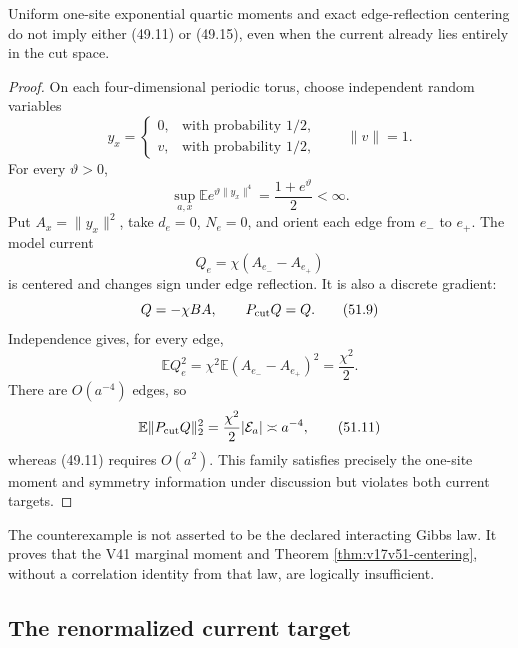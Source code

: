 \documentclass[11pt]{article}
\theoremstyle{remark}
\begin{document}
\begin{countertheorem}
\label{ctr:v17v51-no-go}
Uniform one-site exponential quartic moments and exact edge-reflection
centering do not imply either (49.11) or (49.15), even when the current
already lies entirely in the cut space.
\end{countertheorem}

\begin{proof}
On each four-dimensional periodic torus, choose independent random
variables
\[
 y_x=
 \begin{cases}
 0,&\text{with probability }1/2,\\
 v,&\text{with probability }1/2,
 \end{cases}
 \qquad \|v\|=1.                                  \tag{51.6}
\]
For every \(\vartheta>0\),
\[
 \sup_{a,x}\mathbb E
 e^{\vartheta\|y_x\|^4}
 =\frac{1+e^\vartheta}{2}<\infty.                 \tag{51.7}
\]
Put \(A_x=\|y_x\|^2\), take \(d_e=0\), \(N_e=0\), and orient each
edge from \(e_-\) to \(e_+\).  The model current
\[
 Q_e=\chi(A_{e_-}-A_{e_+})                       \tag{51.8}
\]
is centered and changes sign under edge reflection.  It is also a
discrete gradient:
\[
 Q=-\chi BA,\qquad P_{\rm cut}Q=Q.                \tag{51.9}
\]
Independence gives, for every edge,
\[
 \mathbb E Q_e^2
 =\chi^2\mathbb E(A_{e_-}-A_{e_+})^2
 =\frac{\chi^2}{2}.                               \tag{51.10}
\]
There are \(O(a^{-4})\) edges, so
\[
 \mathbb E\|P_{\rm cut}Q\|_2^2
 =\frac{\chi^2}{2}|\mathcal E_a|
 \asymp a^{-4},                                   \tag{51.11}
\]
whereas (49.11) requires \(O(a^2)\).  This family satisfies precisely
the one-site moment and symmetry information under discussion but
violates both current targets.
\end{proof}

The counterexample is not asserted to be the declared interacting
Gibbs law.  It proves that the V41 marginal moment and Theorem
\ref{thm:v17v51-centering}, without a correlation identity from that
law, are logically insufficient.

\subsection{The renormalized current target}
\end{document}
